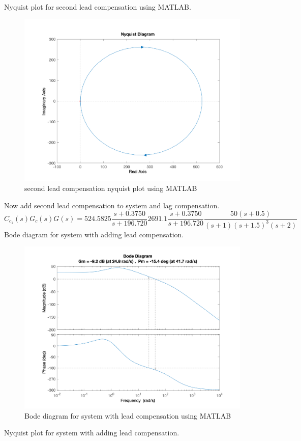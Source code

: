 Nyquist plot for second lead compensation using MATLAB.
\begin{figure}[H]
	\caption{second lead compensation nyquist plot using MATLAB}
	\centering
	\includegraphics[width=12cm]{../Figure/Q1/a/new_controller_nyquist.png}
\end{figure}
Now add second lead compensation to system and lag compensation.
$$
C_{c_1}(s)G_c(s)G(s) = 524.5825\dfrac{s + 0.3750}{s + 196.720}
2691.1\dfrac{s + 0.3750}{s + 196.720}
 \dfrac{50(s+0.5)}{(s+1)(s+1.5)^{3}(s+2)}
$$
Bode diagram for system with adding lead compensation.
\begin{figure}[H]
	\caption{Bode diagram for system with lead compensation using MATLAB}
	\centering
	\includegraphics[width=12cm]{../Figure/Q1/a/two_lead_new_margin.png}
\end{figure}
Nyquist plot for system with adding lead compensation.
